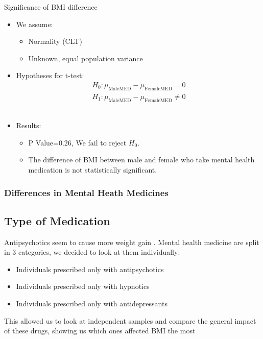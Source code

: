 \documentclass[
	11pt, %
]{beamer}
\begin{document}
\begin{frame}{Significance of BMI difference}
    \begin{itemize}
			\item We assume:
   \begin{itemize}
       \item Normality (CLT)
       \item Unknown, equal population variance
   \end{itemize}

   \item Hypotheses for t-test:
  \begin{equation}
    \begin{split}
        H_0 :	\mu_{\text{MaleMED}}-\mu_{\text{FemaleMED}} = 0 \\
        H_1 :	\mu_{\text{MaleMED}}-\mu_{\text{FemaleMED}} \neq 0
    \end{split}
    \end{equation}\\
                \item Results:
                \begin{itemize}
       \item P Value=$0.26$, We fail to reject $H_0$. \\
       \item The difference of BMI between male and female who take mental health medication is not statistically significant.
   \end{itemize}
			
		\end{itemize}
\end{frame}

\begin{frame}
	\frametitle{Differences in Mental Heath Medicines}\subsection{Type of Medication} %

 Antipsychotics seem to cause more weight gain \citep{alonso,Gates2016,mahli,mazereel2020}.
 Mental health medicine are split in 3 categories, we decided to look at them individually:	
 \begin{itemize}
			\item Individuals prescribed only with antipsychotics 
			\item Individuals prescribed only with hypnotics
            \item Individuals prescribed only with antidepressants
		\end{itemize}
   
    
    
         This allowed us to look at independent samples and compare the general impact of these drugs, showing us which ones affected BMI the most
    
\end{frame}
\end{document}
